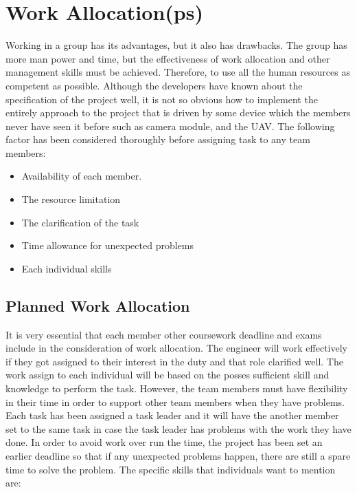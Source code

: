 \section{Work Allocation(ps)}

Working in a group has its advantages, but it also has drawbacks. The group has more man power and time, but the effectiveness of work allocation and other management skills must be achieved. Therefore, to use all the human resources as competent as possible. Although the developers have known about the specification of the project well, it is not so obvious how to implement the entirely approach to the project that is driven by some device which the members never have seen it before such as camera module, and the UAV. The following factor has been considered thoroughly before assigning task to any team members:

\begin{itemize}
\item	Availability of each member.

\item	The resource limitation
 
\item	The clarification of the task

\item   Time allowance for unexpected problems

\item	Each individual skills
\end{itemize}


\subsection{Planned Work Allocation}
 It is very essential that each member other coursework deadline and exams include in the consideration of work allocation. 
The engineer will work effectively if they got assigned  to their interest in the duty and that role clarified well. The work assign to each individual will be based on the posses sufficient skill and knowledge to perform the task. However, the team members must have flexibility in their time in order to support other team members when they have problems. Each task has been assigned a task leader and it will have the another member set to the same task in case the task leader has problems with the work they have done. In order to avoid work over run the time, the project has been set an earlier deadline so that if any unexpected problems happen, there are still a spare time to solve the problem. The specific skills that individuals want to mention are:

